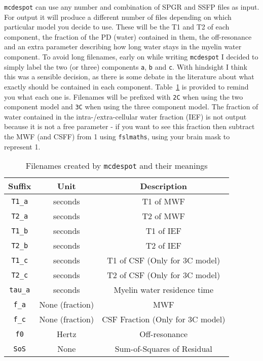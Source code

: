 \documentclass{report}
\begin{document}
\texttt{mcdespot} can use any number and combination of SPGR and SSFP files as input. For output it will produce a different number of files depending on which particular model you decide to use. These will be the T1 and T2 of each component, the fraction of the PD (water) contained in them, the off-resonance and an extra parameter describing how long water stays in the myelin water component. To avoid long filenames, early on while writing \texttt{mcdespot} I decided to simply label the two (or three) components \texttt{a}, \texttt{b} and \texttt{c}. With hindsight I think this was a sensible decision, as there is some debate in the literature about what exactly should be contained in each component. Table~\ref{mcdespotfilenames} is provided to remind you what each one is. Filenames will be prefixed with \texttt{2C} when using the two component model and \texttt{3C} when using the three component model. The fraction of water contained in the intra-/extra-cellular water fraction (IEF) is not output because it is not a free parameter - if you want to see this fraction then subtract the MWF (and CSFF) from 1 using \texttt{fslmaths}, using your brain mask to represent 1.

\begin{table}\begin{center}
\begin{tabular}{c c c}
\hline
Suffix	& Unit	& Description\\
\hline
\texttt{T1\_a}	& seconds & T1 of MWF \\
\texttt{T2\_a}	& seconds & T2 of MWF \\
\texttt{T1\_b}	& seconds & T1 of IEF \\
\texttt{T2\_b}	& seconds & T2 of IEF \\
\texttt{T1\_c}	& seconds & T1 of CSF (Only for 3C model) \\
\texttt{T2\_c}	& seconds & T2 of CSF (Only for 3C model) \\
\texttt{tau\_a}	& seconds & Myelin water residence time \\
\texttt{f\_a}	& None (fraction) & MWF \\
\texttt{f\_c}	& None (fraction) & CSF Fraction (Only for 3C model) \\
\texttt{f0}		& Hertz   & Off-resonance \\
\texttt{SoS}	& None    & Sum-of-Squares of Residual \\
\hline
\end{tabular}
\caption{Filenames created by \texttt{mcdespot} and their meanings}
\label{mcdespotfilenames}
\end{center}\end{table}	
\end{document}
